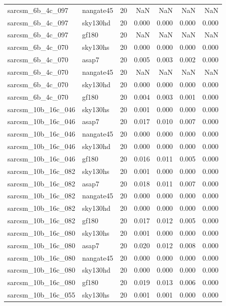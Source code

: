 \begin{tabular}{llrrrrr}
sarcsm\_6b\_4c\_097 & nangate45 & 20 & NaN & NaN & NaN & NaN \\
sarcsm\_6b\_4c\_097 & sky130hd & 20 & 0.000 & 0.000 & 0.000 & 0.000 \\
sarcsm\_6b\_4c\_097 & gf180 & 20 & NaN & NaN & NaN & NaN \\
sarcsm\_6b\_4c\_070 & sky130hs & 20 & 0.000 & 0.000 & 0.000 & 0.000 \\
sarcsm\_6b\_4c\_070 & asap7 & 20 & 0.005 & 0.003 & 0.002 & 0.000 \\
sarcsm\_6b\_4c\_070 & nangate45 & 20 & NaN & NaN & NaN & NaN \\
sarcsm\_6b\_4c\_070 & sky130hd & 20 & 0.000 & 0.000 & 0.000 & 0.000 \\
sarcsm\_6b\_4c\_070 & gf180 & 20 & 0.004 & 0.003 & 0.001 & 0.000 \\
sarcsm\_10b\_16c\_046 & sky130hs & 20 & 0.001 & 0.000 & 0.000 & 0.000 \\
sarcsm\_10b\_16c\_046 & asap7 & 20 & 0.017 & 0.010 & 0.007 & 0.000 \\
sarcsm\_10b\_16c\_046 & nangate45 & 20 & 0.000 & 0.000 & 0.000 & 0.000 \\
sarcsm\_10b\_16c\_046 & sky130hd & 20 & 0.000 & 0.000 & 0.000 & 0.000 \\
sarcsm\_10b\_16c\_046 & gf180 & 20 & 0.016 & 0.011 & 0.005 & 0.000 \\
sarcsm\_10b\_16c\_082 & sky130hs & 20 & 0.001 & 0.000 & 0.000 & 0.000 \\
sarcsm\_10b\_16c\_082 & asap7 & 20 & 0.018 & 0.011 & 0.007 & 0.000 \\
sarcsm\_10b\_16c\_082 & nangate45 & 20 & 0.000 & 0.000 & 0.000 & 0.000 \\
sarcsm\_10b\_16c\_082 & sky130hd & 20 & 0.000 & 0.000 & 0.000 & 0.000 \\
sarcsm\_10b\_16c\_082 & gf180 & 20 & 0.017 & 0.012 & 0.005 & 0.000 \\
sarcsm\_10b\_16c\_080 & sky130hs & 20 & 0.001 & 0.000 & 0.000 & 0.000 \\
sarcsm\_10b\_16c\_080 & asap7 & 20 & 0.020 & 0.012 & 0.008 & 0.000 \\
sarcsm\_10b\_16c\_080 & nangate45 & 20 & 0.000 & 0.000 & 0.000 & 0.000 \\
sarcsm\_10b\_16c\_080 & sky130hd & 20 & 0.000 & 0.000 & 0.000 & 0.000 \\
sarcsm\_10b\_16c\_080 & gf180 & 20 & 0.019 & 0.013 & 0.006 & 0.000 \\
sarcsm\_10b\_16c\_055 & sky130hs & 20 & 0.001 & 0.001 & 0.000 & 0.000 \\

\end{tabular}
